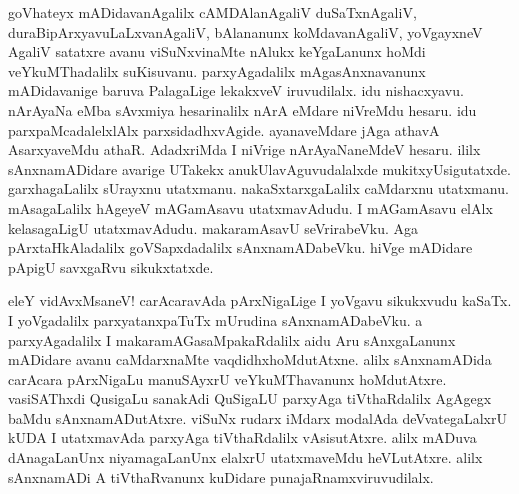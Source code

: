 \documentclass{article}
\begin{document}
\begin{mn}%
goVhateyx mADidavanAgalilx cAMDAlanAgaliV duSaTxnAgaliV, duraBipArxyavuLaLxvanAgaliV, 
bAlananunx koMdavanAgaliV, yoVgayxneV AgaliV satatxre avanu viSuNxvinaMte nAlukx keYgaLanunx 
hoMdi veYkuMThadalilx suKisuvanu. parxyAgadalilx mAgasAnxnavanunx mADidavanige baruva 
PalagaLige lekakxveV iruvudilalx. idu nishacxyavu. nArAyaNa eMba sAvxmiya hesarinalilx nArA 
eMdare niVreMdu hesaru. idu parxpaMcadalelxlAlx parxsidadhxvAgide. ayanaveMdare jAga athavA 
AsarxyaveMdu athaR. AdadxriMda I niVrige nArAyaNaneMdeV hesaru. ililx sAnxnamADidare avarige 
UTakekx anukUlavAguvudalalxde mukitxyUsigutatxde. garxhagaLalilx sUrayxnu utatxmanu. 
nakaSxtarxgaLalilx caMdarxnu utatxmanu. mAsagaLalilx hAgeyeV mAGamAsavu utatxmavAdudu. I 
mAGamAsavu elAlx kelasagaLigU utatxmavAdudu. makaramAsavU
seVrirabeVku. Aga pArxtaHkAladalilx goVSapxdadalilx sAnxnamADabeVku. hiVge mADidare pApigU 
savxgaRvu sikukxtatxde.
\end{mn}

\begin{mn}%
eleY vidAvxMsaneV! carAcaravAda pArxNigaLige I yoVgavu sikukxvudu kaSaTx. I yoVgadalilx 
parxyatanxpaTuTx mUrudina sAnxnamADabeVku. a parxyAgadalilx I makaramAGasaMpakaRdalilx aidu 
Aru sAnxgaLanunx mADidare avanu caMdarxnaMte vaqdidhxhoMdutAtxne. alilx sAnxnamADida 
carAcara pArxNigaLu manuSAyxrU veYkuMThavanunx hoMdutAtxre. vasiSAThxdi QusigaLu sanakAdi 
QuSigaLU parxyAga tiVthaRdalilx AgAgegx baMdu sAnxnamADutAtxre. viSuNx rudarx iMdarx 
modalAda deVvategaLalxrU kUDA I utatxmavAda parxyAga tiVthaRdalilx vAsisutAtxre. alilx 
mADuva dAnagaLanUnx niyamagaLanUnx elalxrU utatxmaveMdu heVLutAtxre. alilx sAnxnamADi A 
tiVthaRvanunx kuDidare punajaRnamxviruvudilalx.
\end{mn}

\end{document}

